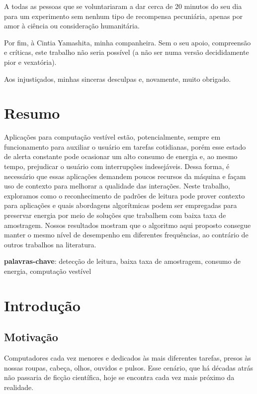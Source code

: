 \documentclass[12pt]{article}
\begin{document}
	A todas as pessoas que se voluntariaram a dar cerca de 20 minutos do seu dia para um experimento sem nenhum tipo de recompensa pecuniária, apenas por amor à ciência ou consideração humanitária.
	
	Por fim, à Cintia Yamashita, minha companheira. Sem o seu apoio, compreensão e críticas, este trabalho não seria possível (a não ser numa versão decididamente pior e vexatória).
	
	Aos injustiçados, minhas sinceras desculpas e, novamente, muito obrigado.
	\clearpage
	
	\tableofcontents
	\clearpage
	
	\section{Resumo}
	
	Aplicações para computação vestível estão, potencialmente, sempre em funcionamento para auxiliar o usuário em tarefas cotidianas, porém esse estado de alerta constante pode ocasionar um alto consumo de energia e, ao mesmo tempo, prejudicar o usuário com interrupções indesejáveis. Dessa forma, é necessário que essas aplicações demandem poucos recursos da máquina e façam uso de contexto para melhorar a qualidade das interações. Neste trabalho, exploramos como o reconhecimento de padrões de leitura pode prover contexto para aplicações e quais abordagens algorítmicas podem ser empregadas para preservar energia por meio de soluções que trabalhem com baixa taxa de amostragem. Nossos resultados mostram que o algoritmo aqui proposto consegue manter o mesmo nível de desempenho em diferentes frequências, ao contrário de outros trabalhos na literatura.
	
	\vspace{1cm}
	\noindent \textbf{palavras-chave}: detecção de leitura, baixa taxa de amostragem, consumo de energia, computação vestível
	
	\clearpage
	
	
	\section{Introdução}
	
		\subsection{Motivação}
		Computadores cada vez menores e dedicados às mais diferentes tarefas, presos às nossas roupas, cabeça, olhos, ouvidos e pulsos. Esse cenário, que há décadas atrás não passaria de ficção científica, hoje se encontra cada vez mais próximo da realidade. 
		
\end{document}

